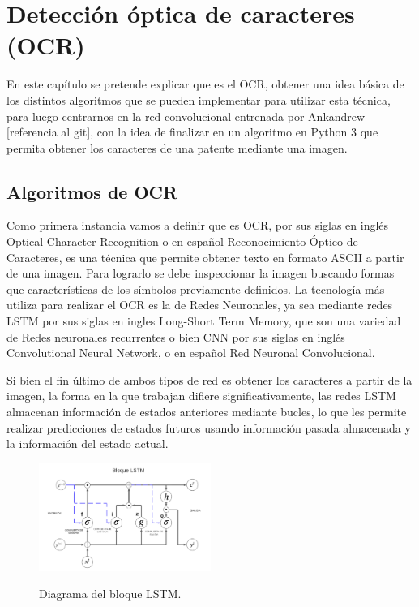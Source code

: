 \chapter{Detección óptica de caracteres (OCR)}

En este capítulo se pretende explicar que es el OCR, obtener una idea básica
de los distintos algoritmos que se pueden implementar para
utilizar esta técnica, para luego centrarnos en la red convolucional entrenada por
Ankandrew [referencia al git], con la idea de finalizar en un algoritmo en Python 3
que permita obtener los caracteres de una patente mediante una imagen.

\section{Algoritmos de OCR}
Como primera instancia vamos a definir que es OCR, por sus siglas en inglés Optical Character
Recognition o en español Reconocimiento Óptico de Caracteres, es una técnica que permite
obtener texto en formato ASCII a partir de una imagen.
Para lograrlo se debe inspeccionar la imagen buscando formas que características de los símbolos previamente definidos.
La tecnología más utiliza para realizar el OCR es la de Redes Neuronales, ya sea
mediante redes LSTM por sus siglas en ingles Long-Short Term Memory, que son una variedad de Redes
neuronales recurrentes o bien CNN por sus siglas en inglés Convolutional Neural Network, o en español Red
Neuronal Convolucional.

Si bien el fin último de ambos tipos de red es obtener los caracteres a partir de la imagen, la forma en
la que trabajan difiere significativamente, las redes LSTM almacenan información de estados anteriores mediante bucles,
lo que les permite realizar predicciones de estados futuros usando información pasada almacenada y la información
del estado actual.
\begin{figure}[h]
    \centering
    \includegraphics[width=0.5\textwidth]{imgs/diagrama-lstm.png}
    \label{fig:diagrama-LSTM}
    \caption{Diagrama del bloque LSTM.}
\end{figure}

